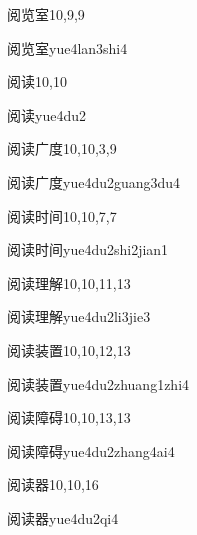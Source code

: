 \begin{entry}{阅览室}{10,9,9}
  \begin{phonetics}{阅览室}{yue4lan3shi4}
  \end{phonetics}
\end{entry}

\begin{entry}{阅读}{10,10}
  \begin{phonetics}{阅读}{yue4du2}
  \end{phonetics}
\end{entry}

\begin{entry}{阅读广度}{10,10,3,9}
  \begin{phonetics}{阅读广度}{yue4du2guang3du4}
  \end{phonetics}
\end{entry}

\begin{entry}{阅读时间}{10,10,7,7}
  \begin{phonetics}{阅读时间}{yue4du2shi2jian1}
  \end{phonetics}
\end{entry}

\begin{entry}{阅读理解}{10,10,11,13}
  \begin{phonetics}{阅读理解}{yue4du2li3jie3}
  \end{phonetics}
\end{entry}

\begin{entry}{阅读装置}{10,10,12,13}
  \begin{phonetics}{阅读装置}{yue4du2zhuang1zhi4}
  \end{phonetics}
\end{entry}

\begin{entry}{阅读障碍}{10,10,13,13}
  \begin{phonetics}{阅读障碍}{yue4du2zhang4ai4}
  \end{phonetics}
\end{entry}

\begin{entry}{阅读器}{10,10,16}
  \begin{phonetics}{阅读器}{yue4du2qi4}
  \end{phonetics}
\end{entry}

